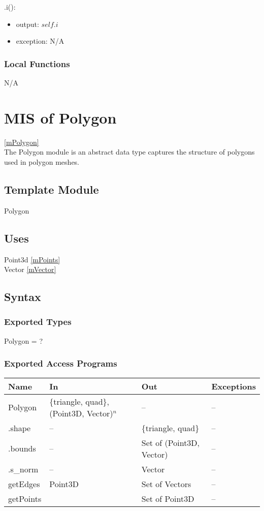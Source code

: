 \documentclass[12pt, titlepage]{article}
\begin{document}
\noindent .i():
\begin{itemize}
	\item output: $self.i$
	\item exception: N/A
\end{itemize}

\subsubsection{Local Functions}
N/A

\newpage

\section{MIS of Polygon} \ref{mPolygon} \\
The Polygon module is an abstract data type captures the structure of polygons 
used in polygon meshes.

\subsection{Template Module}
Polygon

\subsection{Uses}
Point3d \ref{mPoints} \\
Vector \ref{mVector}\\

\subsection{Syntax}
\subsubsection{Exported Types}
Polygon = ?
\subsubsection{Exported Access Programs}
\begin{center}
	\begin{tabular}{p{2cm} p{4cm} p{2cm} p{4cm}}
		\hline
		\textbf{Name} & \textbf{In} & \textbf{Out} & \textbf{Exceptions} \\
		\hline
		Polygon & \{triangle, quad\}, (Point3D, Vector)$^n$ & -- & -- \\
		.shape & -- & \{triangle, quad\} & -- \\
		.bounds & -- & Set of (Point3D, Vector) & -- \\
		.s\_norm & -- & Vector & -- \\
		getEdges & Point3D & Set of Vectors & -- \\
		getPoints & & Set of Point3D & -- \\
		\hline
	\end{tabular}
\end{center}
\end{document}
